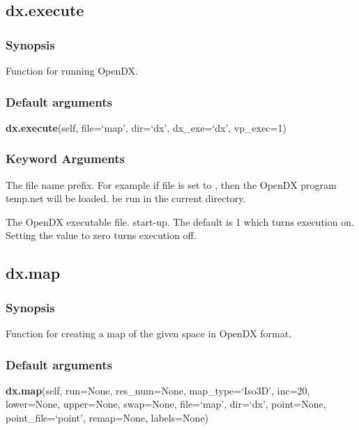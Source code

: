 \subsection{dx.execute}


\subsubsection{Synopsis}

Function for running OpenDX.

\subsubsection{Default arguments}

\textsf{\textbf{dx.execute}(self, file=`map', dir=`dx', dx\_exe=`dx', vp\_exec=1)}


\subsubsection{Keyword Arguments}

  The file name prefix.  For example if file is set to 
, then the OpenDX program temp.net will be loaded.
be run in the current directory.

  The OpenDX executable file.
start-up.  The default is 1 which turns execution on.  Setting the value to zero turns
execution off.


\newpage

\subsection{dx.map}


\subsubsection{Synopsis}

Function for creating a map of the given space in OpenDX format.

\subsubsection{Default arguments}

\textsf{\textbf{dx.map}(self, run=None, res\_num=None, map\_type=`Iso3D', inc=20, lower=None, upper=None, swap=None, file=`map', dir=`dx', point=None, point\_file=`point', remap=None, labels=None)}


